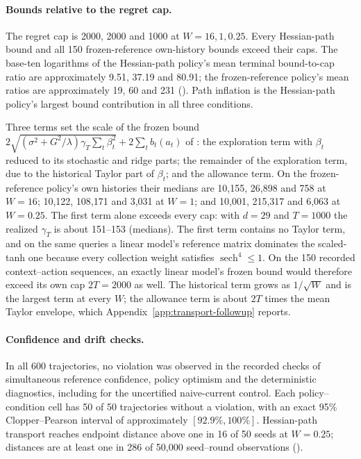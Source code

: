 \paragraph{Bounds relative to the regret cap.}
The regret cap is 2000, 2000 and 1000 at $W=16,1,0.25$. Every Hessian-path
bound and all 150 frozen-reference own-history bounds exceed their caps.
The base-ten logarithms of the Hessian-path policy's mean terminal bound-to-cap
ratio are approximately 9.51, 37.19 and 80.91; the frozen-reference policy's
mean ratios are approximately 19, 60 and 231
(). Path inflation is the
Hessian-path policy's largest bound contribution in all three conditions.

Three terms set the scale of the frozen bound
$2\sqrt{(\sigma^2+G^2/\lambda)\gamma_T\sum_t\beta_t^2}+2\sum_tb_t(a_t)$ of
: the exploration term with $\beta_t$ reduced to
its stochastic and ridge parts; the remainder of the exploration term, due to
the historical Taylor part of $\beta_t$; and the allowance term. On the
frozen-reference policy's own histories their medians are 10,155, 26,898 and
758 at $W=16$; 10,122, 108,171 and 3,031 at $W=1$; and 10,001, 215,317 and
6,063 at $W=0.25$. The first term alone exceeds every cap: with $d=29$ and
$T=1000$ the realized $\gamma_T$ is about 151--153 (medians). The first term
contains no Taylor term, and on the same queries a linear model's reference
matrix dominates the scaled-tanh one because every collection weight satisfies
$\operatorname{sech}^4\le1$. On the 150 recorded context--action sequences,
an exactly linear model's frozen bound would therefore exceed its own cap
$2T=2000$ as well. The historical term grows as $1/\sqrt W$ and is the
largest term at every $W$; the allowance term is about $2T$ times the mean
Taylor envelope, which Appendix~\ref{app:transport-followup} reports.

\paragraph{Confidence and drift checks.}
In all 600 trajectories, no violation was observed in the recorded checks of
simultaneous reference confidence, policy optimism and the deterministic
diagnostics, including for the uncertified naive-current control. Each
policy--condition cell has 50 of 50 trajectories without a violation, with an
exact 95\% Clopper--Pearson interval of approximately $[92.9\%,100\%]$.
Hessian-path transport reaches endpoint distance above one in 16 of 50 seeds
at $W=0.25$; distances are at least one in 286 of 50,000 seed--round
observations ().

